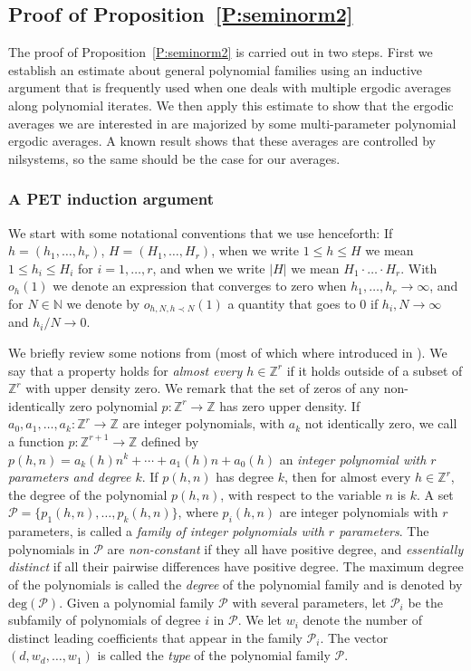\documentclass[11pt]{amsart}
\newcommand{\N}{\mathbb{N}}
\newcommand{\Z}{\mathbb{Z}}
\theoremstyle{plain}
\theoremstyle{definition}
\theoremstyle{remark}
\begin{document}
\subsection{Proof of Proposition~\ref{P:seminorm2}}
The
proof  of Proposition~\ref{P:seminorm2} is carried out in two steps.
First we establish an estimate
about general polynomial families using an inductive argument that is
frequently used when one deals with multiple ergodic averages along
polynomial iterates. We then apply this estimate to show that the
ergodic averages we are interested in are majorized by some
multi-parameter polynomial ergodic averages. A known result  shows
that these averages are controlled by nilsystems, so the same should
be the case for our averages.
\subsubsection{A PET induction argument}
We start with some notational conventions that we  use henceforth: If
$h=(h_1,\ldots,h_r)$, $H=(H_1,\ldots,H_r)$, when we write $1\leq h\leq
H$ we mean $1\leq h_i\leq H_i$ for $i=1,\ldots,r$, and when we write
$|H|$ we mean $H_1\cdot\ldots\cdot H_r$. With $o_{h}(1)$ we denote an
expression that converges to zero when $h_1,\ldots,h_r\to\infty$, and
for $N\in\N$ we denote by $o_{h, N, h\prec N}(1)$ a quantity that goes
to $0$ if $h_i,N\to\infty$ and $h_i/N\to 0$.

We briefly review some notions from \cite{HK2} (most of which where
introduced in \cite{Be2}).  We say that a property holds for
\emph{almost every $h\in\Z^r$} if it holds outside of  a subset of
$\Z^r$ with upper density zero. We remark that the set of zeros of any
non-identically zero polynomial $p\colon \Z^r \to \Z$ has zero upper
density.
If $a_0,a_1, \ldots, a_k\colon \Z^r\to \Z$ are integer polynomials, with $a_k$ not identically zero,  we call a
function $p\colon \Z^{r+1}\to \Z$ defined by
$p(h,n)=a_k(h)n^k+\cdots+a_1(h)n+a_0(h)$ an \emph{integer polynomial
  with $r$ parameters and degree $k$}. If $p(h,n)$ has
  degree $k$, then for almost every $h\in \Z^r$, the degree of
  the polynomial $p(h,n)$, with respect to the variable $n$ is $k$.
  A set
$\mathcal{P}=\{p_1(h,n),\ldots,p_k(h,n)\}$, where $p_i(h,n)$ are
integer polynomials with $r$ parameters, is called a \emph{family of
  integer polynomials with $r$ parameters}. The polynomials in $\mathcal{P}$ are
  \emph{non-constant} if they all have positive degree,  and \emph{essentially
  distinct} if  all their pairwise differences   have positive degree.
The maximum degree of the polynomials  is called the \emph{degree} of the polynomial family and
is denoted by $\text{deg}(\mathcal{P})$.  Given a
polynomial family $\mathcal{P}$ with several parameters, let $\mathcal{P}_i$ be the subfamily
of polynomials of degree $i$ in $\mathcal{P}$. We let $w_i$ denote the
number of distinct leading coefficients that appear in the family
$\mathcal{P}_i$. The vector $(d,w_d,\ldots,w_1)$ is called the
\emph{type} of the polynomial family $\mathcal{P}$.
\end{document}
